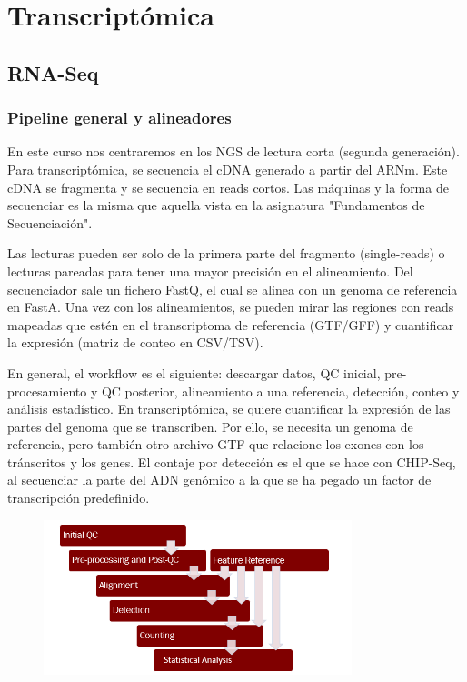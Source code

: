 \part{Transcriptómica}
\chapter{RNA-Seq}
\section{Pipeline general y alineadores}
En este curso nos centraremos en los NGS de lectura corta (segunda generación). Para transcriptómica, se secuencia el cDNA generado a partir del ARNm. Este cDNA se fragmenta y se secuencia en reads cortos. Las máquinas y la forma de secuenciar es la misma que aquella vista en la asignatura "Fundamentos de Secuenciación". 

Las lecturas pueden ser solo de la primera parte del fragmento (single-reads) o lecturas pareadas para tener una mayor precisión en el alineamiento. Del secuenciador sale un fichero FastQ, el cual se alinea con un genoma de referencia en FastA. Una vez con los alineamientos, se pueden mirar las regiones con reads mapeadas que estén en el transcriptoma de referencia (GTF/GFF) y cuantificar la expresión (matriz de conteo en CSV/TSV). 

En general, el workflow es el siguiente: descargar datos, QC inicial, pre-procesamiento y QC posterior, alineamiento a una referencia, detección, conteo y análisis estadístico. En transcriptómica, se quiere cuantificar la expresión de las partes del genoma que se transcriben. Por ello, se necesita un genoma de referencia, pero también otro archivo GTF que relacione los exones con los tránscritos y los genes. El contaje por detección es el que se hace con CHIP-Seq, al secuenciar la parte del ADN genómico a la que se ha pegado un factor de transcripción predefinido. 

\begin{figure}[h]
\centering
\includegraphics[width = 0.8\textwidth]{figs/ngs-analysis-workflow.png}
\end{figure}

